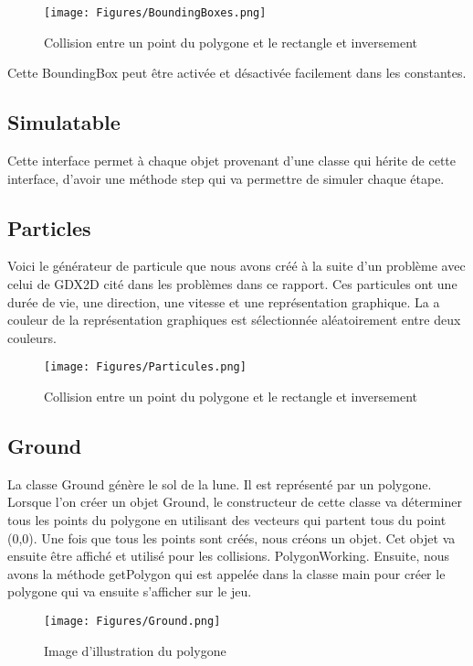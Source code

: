 \begin{figure}[h]
 \centering
 \texttt{[image: Figures/BoundingBoxes.png]}
 \caption{Collision entre un point du polygone et le rectangle et inversement}
 \label{figure:BoundingBoxes}
\end{figure}

Cette BoundingBox peut être activée et désactivée facilement dans les constantes.

\subsection{Simulatable}
Cette interface permet à chaque objet provenant d’une classe qui hérite de cette interface, d’avoir une méthode step qui va permettre de simuler chaque étape.

\subsection{Particles}
Voici le générateur de particule que nous avons créé à la suite d’un problème avec celui de GDX2D cité dans les problèmes dans ce rapport. Ces particules ont une durée de vie, une direction, une vitesse et une représentation graphique. La a couleur de la représentation graphiques est sélectionnée aléatoirement entre deux couleurs.

\begin{figure}[h]
 \centering
 \texttt{[image: Figures/Particules.png]}
 \caption{Collision entre un point du polygone et le rectangle et inversement}
 \label{figure:Particules}
\end{figure}

\subsection{Ground}
La classe Ground génère le sol de la lune. Il est représenté par un polygone. Lorsque l’on créer un objet Ground, le constructeur de cette classe va déterminer tous les points du polygone en utilisant des vecteurs qui partent tous du point (0,0). Une fois que tous les points sont créés, nous créons un objet. Cet objet va ensuite être affiché et utilisé pour les collisions.  PolygonWorking. Ensuite, nous avons la méthode getPolygon qui est appelée dans la classe main pour créer le polygone qui va ensuite s’afficher sur le jeu.

\begin{figure}[h]
 \centering
 \texttt{[image: Figures/Ground.png]}
 \caption{Image d'illustration du polygone}
 \label{figure:Ground}
\end{figure}

